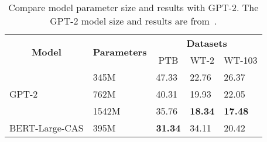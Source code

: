 \documentclass[11pt,a4paper]{article}
\begin{document}
\begin{table*}[]
{
\centering
\begin{tabular}{|ll|l|l|l|l|l|l|}
\hline
\multicolumn{1}{|c|}{\multirow{3}{*}{\textbf{Model}}} & \multirow{3}{*}{\textbf{Parameters}} & \multicolumn{6}{c|}{\textbf{Datasets}}                                                                                                \\ \cline{3-8} 
\multicolumn{1}{|c|}{}                                &                                      & \multicolumn{2}{c|}{\multirow{2}{*}{PTB}} & \multicolumn{2}{c|}{\multirow{2}{*}{WT-2}} & \multicolumn{2}{c|}{\multirow{2}{*}{WT-103}} \\
\multicolumn{1}{|c|}{}                                &                                      & \multicolumn{2}{c|}{}                     & \multicolumn{2}{c|}{}                      & \multicolumn{2}{c|}{}                        \\ \hline
\multicolumn{1}{|l|}{\multirow{3}{*}{GPT-2}}          & 345M                                 & \multicolumn{2}{l|}{47.33}                & \multicolumn{2}{l|}{22.76}                 & \multicolumn{2}{l|}{26.37}                   \\ \cline{2-8} 
\multicolumn{1}{|l|}{}                                & 762M                                 & \multicolumn{2}{l|}{40.31}                & \multicolumn{2}{l|}{19.93}                 & \multicolumn{2}{l|}{22.05}                   \\ \cline{2-8} 
\multicolumn{1}{|l|}{}                                & 1542M                                & \multicolumn{2}{l|}{35.76}                & \multicolumn{2}{l|}{\textbf{18.34}}        & \multicolumn{2}{l|}{\textbf{17.48}}          \\ \hline
\multicolumn{1}{|l|}{BERT-Large-CAS}            & 395M                                 & \multicolumn{2}{l|}{\textbf{31.34}}       & \multicolumn{2}{l|}{34.11}                 & \multicolumn{2}{l|}{20.42}                   \\ \hline
\end{tabular}
\caption{Compare model parameter size and results with GPT-2. The GPT-2 model size and results are from~\cite{radford2019language}.}
\label{tab:compgpt2}
}
\end{table*}
\end{document}
